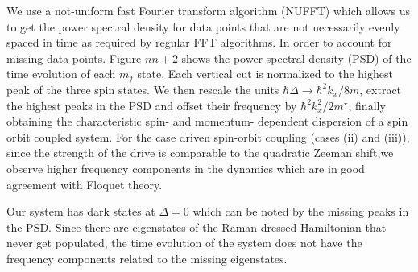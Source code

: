 

We use a not-uniform fast Fourier transform algorithm (NUFFT) which allows us to get the power spectral density for data points that are not necessarily evenly spaced in time as required by regular FFT algorithms. In order to account for missing data points. Figure $nn+2$ shows the power spectral density (PSD) of the time evolution of each $m_f$ state. Each vertical cut is normalized to the highest peak of the three spin states. We then rescale the units $\hbar\Delta\rightarrow	 \hbar^2k_x/8m$, extract the highest peaks in the PSD and offset their frequency by $\hbar^2k_x^2/2m^{\star}$, finally obtaining the characteristic spin- and momentum- dependent dispersion of a spin orbit coupled system. For the case driven spin-orbit coupling (cases (ii) and (iii)), since the strength of the drive is comparable to the quadratic Zeeman shift,we observe higher frequency components in the dynamics which are in good agreement with Floquet theory.

Our system has dark states at $\Delta=0$ which can be noted by the missing peaks in the PSD. Since there are eigenstates of the Raman dressed Hamiltonian that never get populated, the time evolution of the system does not have the frequency components related to the missing eigenstates. 

